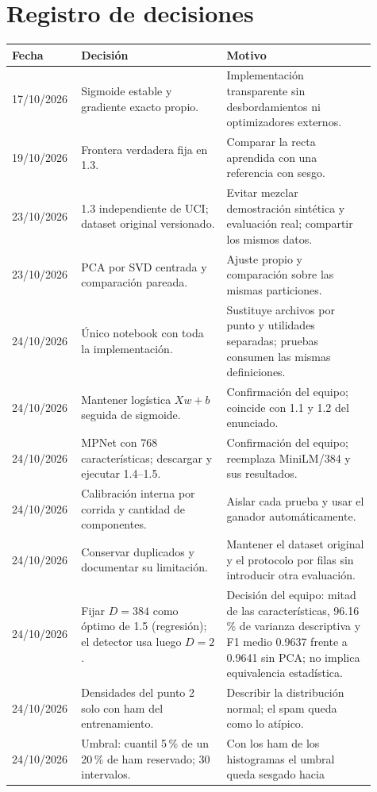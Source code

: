 \documentclass[11pt,letterpaper]{article}
\renewcommand{\_}{\originalunderscore\allowbreak}
\begin{document}
\section{Registro de decisiones}
\small
\begin{longtable}{p{0.14\linewidth}p{0.38\linewidth}p{0.39\linewidth}}
\toprule
\textbf{Fecha} & \textbf{Decisión} & \textbf{Motivo}\\
\midrule\endhead
17/10/2026 & Sigmoide estable y gradiente exacto propio. & Implementación
transparente sin desbordamientos ni optimizadores externos.\\
19/10/2026 & Frontera verdadera fija en 1.3. & Comparar la recta aprendida
con una referencia con sesgo.\\
23/10/2026 & 1.3 independiente de UCI; dataset original versionado. & Evitar
mezclar demostración sintética y evaluación real; compartir los mismos datos.\\
23/10/2026 & PCA por SVD centrada y comparación pareada. & Ajuste propio y
comparación sobre las mismas particiones.\\
24/10/2026 & Único notebook con toda la implementación. & Sustituye archivos
por punto y utilidades separadas; pruebas consumen las mismas definiciones.\\
24/10/2026 & Mantener logística $Xw+b$ seguida de sigmoide. & Confirmación del
equipo; coincide con 1.1 y 1.2 del enunciado.\\
24/10/2026 & MPNet con 768 características; descargar y ejecutar 1.4--1.5. &
Confirmación del equipo; reemplaza MiniLM/384 y sus resultados.\\
24/10/2026 & Calibración interna por corrida y cantidad de componentes. &
Aislar cada prueba y usar el ganador automáticamente.\\
24/10/2026 & Conservar duplicados y documentar su limitación. & Mantener el
dataset original y el protocolo por filas sin introducir otra evaluación.\\
24/10/2026 & Fijar $D=384$ como óptimo de 1.5 (regresión); el detector usa luego $D=2$. & Decisión del equipo: mitad de
las características, 96.16\,\% de varianza descriptiva y F1 medio 0.9637
frente a 0.9641 sin PCA; no implica equivalencia estadística.\\
24/10/2026 & Densidades del punto 2 solo con ham del entrenamiento. &
Describir la distribución normal; el spam queda como lo atípico.\\
24/10/2026 & Umbral: cuantil 5\,\% de un 20\,\% de ham reservado; 30
intervalos. & Con los ham de los histogramas el umbral queda sesgado hacia

\end{longtable}
\end{document}
